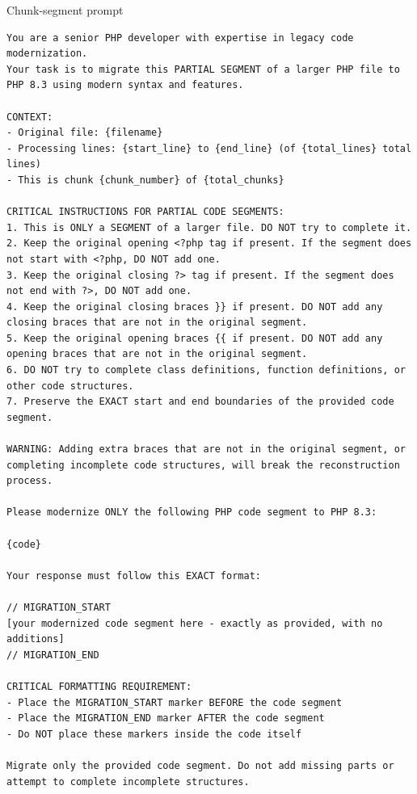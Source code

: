 \begin{promptbox}{Chunk-segment prompt}
\noindent\begin{Verbatim}[breaklines=true,breakanywhere=true,fontsize=\footnotesize]
You are a senior PHP developer with expertise in legacy code modernization.
Your task is to migrate this PARTIAL SEGMENT of a larger PHP file to PHP 8.3 using modern syntax and features.

CONTEXT:
- Original file: {filename}
- Processing lines: {start_line} to {end_line} (of {total_lines} total lines)
- This is chunk {chunk_number} of {total_chunks}

CRITICAL INSTRUCTIONS FOR PARTIAL CODE SEGMENTS:
1. This is ONLY a SEGMENT of a larger file. DO NOT try to complete it.
2. Keep the original opening <?php tag if present. If the segment does not start with <?php, DO NOT add one.
3. Keep the original closing ?> tag if present. If the segment does not end with ?>, DO NOT add one.
4. Keep the original closing braces }} if present. DO NOT add any closing braces that are not in the original segment.
5. Keep the original opening braces {{ if present. DO NOT add any opening braces that are not in the original segment.
6. DO NOT try to complete class definitions, function definitions, or other code structures.
7. Preserve the EXACT start and end boundaries of the provided code segment.

WARNING: Adding extra braces that are not in the original segment, or completing incomplete code structures, will break the reconstruction process.

Please modernize ONLY the following PHP code segment to PHP 8.3:

{code}

Your response must follow this EXACT format:

// MIGRATION_START
[your modernized code segment here - exactly as provided, with no additions]
// MIGRATION_END

CRITICAL FORMATTING REQUIREMENT:
- Place the MIGRATION_START marker BEFORE the code segment
- Place the MIGRATION_END marker AFTER the code segment
- Do NOT place these markers inside the code itself

Migrate only the provided code segment. Do not add missing parts or attempt to complete incomplete structures.
\end{Verbatim}
\end{promptbox}

